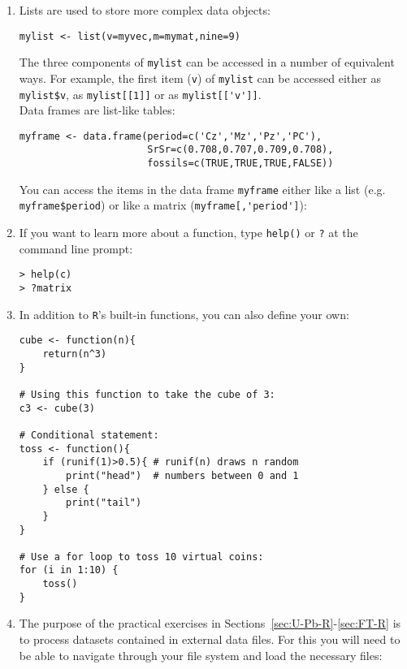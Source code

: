 \documentclass{book}
\begin{document}
\begin{enumerate}
\item Lists are used to store more complex data objects:

\begin{verbatim}
mylist <- list(v=myvec,m=mymat,nine=9)
\end{verbatim}

The three components of \texttt{mylist} can be accessed in a number of
equivalent ways. For example, the first item (\texttt{v}) of
\texttt{mylist} can be accessed either as \verb|mylist$v|, as
\verb|mylist[[1]]| or as \verb|mylist[['v']]|.\\

Data frames are list-like tables:

\begin{verbatim}
myframe <- data.frame(period=c('Cz','Mz','Pz','PC'),
                      SrSr=c(0.708,0.707,0.709,0.708),
                      fossils=c(TRUE,TRUE,TRUE,FALSE))
\end{verbatim}

You can access the items in the data frame \texttt{myframe} either
like a list (e.g. \verb|myframe$period|) or like a matrix
(\verb|myframe[,'period']|):

\item If you want to learn more about a function, type \texttt{help()} or
\texttt{?} at the command line prompt:

\begin{verbatim}
> help(c)
> ?matrix
\end{verbatim}

\item In addition to \texttt{R}'s built-in functions, you can also define
  your own:

\begin{verbatim}
cube <- function(n){
    return(n^3)
}

# Using this function to take the cube of 3:
c3 <- cube(3)

# Conditional statement:
toss <- function(){
    if (runif(1)>0.5){ # runif(n) draws n random 
        print("head")  # numbers between 0 and 1
    } else {
        print("tail")
    }
}

# Use a for loop to toss 10 virtual coins:
for (i in 1:10) {
    toss()
}
\end{verbatim}

\item The purpose of the practical exercises in
  Sections~\ref{sec:U-Pb-R}-\ref{sec:FT-R} is to process datasets
  contained in external data files. For this you will need to be able
  to navigate through your file system and load the necessary files:


\end{enumerate}
\end{document}
